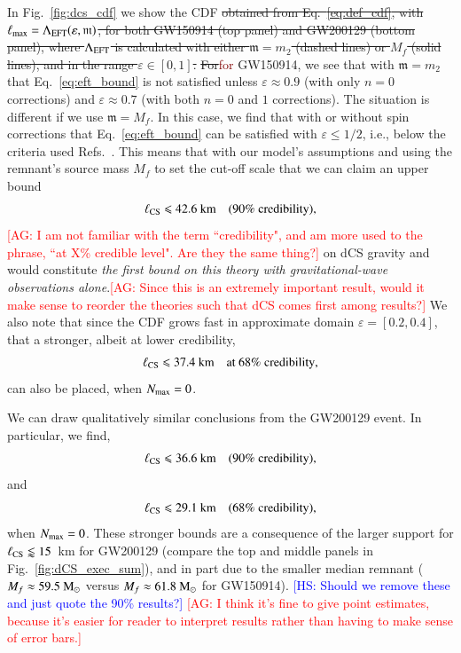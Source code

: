 \documentclass[twocolumn,
               prd,
               aps,
               superscriptaddress,
               tightenlines,
               nofootinbib,
               eqsecnum,
               amsfonts,
               amsmath,
               longbibliography]{revtex4-1}
\newcommand{\gm}{\mathfrak{m}}
\newcommand{\msun}{~{\rm M}_{\odot}}
\newcommand{\agcomm}[1]{{\textcolor{red}{{[AG: #1]}} }}
\newcommand{\ag}[1]{{\textcolor{Maroon}{{#1}} }}
\newcommand{\hs}[1]{{\textcolor{blue}{{[HS: #1]}} }}
\begin{document}
In Fig.~\ref{fig:dcs_cdf} we show the CDF
\sout{obtained from Eq.~\eqref{eq:def_cdf}, with $\ell_{\rm max} = \Lambda_{\rm EFT} (\varepsilon, \gm)$,
for both GW150914 (top panel) and GW200129 (bottom panel), where $\Lambda_{\rm EFT}$
is calculated with either $\gm = m_2$ (dashed lines) or $M_{f}$ (solid lines),
and in the range $\varepsilon \in [0,1]$.}
%
\sout{For}\ag{for} GW150914, we see that with $\gm = m_2$ that Eq.~\eqref{eq:eft_bound} is not
satisfied unless $\varepsilon \approx 0.9$ (with only $n=0$ corrections) and
$\varepsilon \approx 0.7$ (with both $n=0$ and $1$ corrections).
%
The situation is different if we use $\gm = M_f$. In this case, we find that
with or without spin corrections that Eq.~\eqref{eq:eft_bound} can be satisfied
with $\varepsilon \leqslant 1/2$, i.e., below the criteria used
Refs.~\cite{Nair:2019iur,Perkins:2021mhb,Lyu:2022gdr}.
%
This means that with our model's assumptions and using the remnant's source mass $M_f$ to set the
cut-off scale that we can claim an upper bound
%
\begin{equation}
\ell_{\rm CS} \leqslant 42.6~\textrm{km}
\quad \textrm{(90\% credibility)},
\end{equation}
\agcomm{I am not familiar with the term ``credibility", and am more used to the phrase, ``at X\% credible level".
Are they the same thing?}
%
on dCS gravity and would constitute \emph{the first bound on this theory with
gravitational-wave observations alone}.\agcomm{Since this is an extremely important
result, would it make sense to reorder the theories such that dCS comes first among results?}
%
We also note that since the CDF grows fast in approximate domain $\varepsilon = [0.2, 0.4]$,
that a stronger, albeit at lower credibility,
%
\begin{equation}
\ell_{\rm CS} \leqslant 37.4~\textrm{km}
\quad \textrm{at 68\% credibility},
\end{equation}
%
can also be placed, when $N_{\rm max}=0$.

We can draw qualitatively similar conclusions from the GW200129 event.
In particular, we find,
%
\begin{equation}
\ell_{\rm CS} \leqslant 36.6~\textrm{km}
\quad \textrm{(90\% credibility)},
\end{equation}
%
and
%
\begin{equation}
\ell_{\rm CS} \leqslant 29.1~\textrm{km}
\quad \textrm{(68\% credibility)},
\end{equation}
%
when $N_{\rm max}=0$.
%
These stronger bounds are a consequence of the larger support for $\ell_{\rm CS} \lessapprox 15$~km
for GW200129 (compare the top and middle panels in Fig.~\ref{fig:dCS_exec_sum}), and in part due to
the smaller median remnant ($M_{f} \approx 59.5\msun$ versus $M_{f} \approx 61.8\msun$ for GW150914).
%
\hs{Should we remove these and just quote the 90\% results?}\agcomm{I think
it's fine to give point estimates, because it's easier for reader to interpret results
rather than having to make sense of error bars.}
\end{document}
